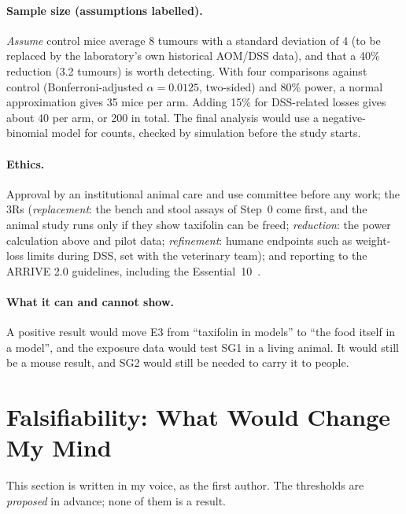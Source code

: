 \documentclass[11pt,a4paper]{article}
\begin{document}
\paragraph{Sample size (assumptions labelled).} \emph{Assume} control mice average 8 tumours with a standard deviation of 4 (to be replaced by the laboratory's own historical AOM/DSS data), and that a 40\% reduction (3.2 tumours) is worth detecting. With four comparisons against control (Bonferroni-adjusted $\alpha=0.0125$, two-sided) and 80\% power, a normal approximation gives 35 mice per arm. Adding 15\% for DSS-related losses gives about 40 per arm, or 200 in total. The final analysis would use a negative-binomial model for counts, checked by simulation before the study starts.

\paragraph{Ethics.} Approval by an institutional animal care and use committee before any work; the 3Rs (\emph{replacement}: the bench and stool assays of Step~0 come first, and the animal study runs only if they show taxifolin can be freed; \emph{reduction}: the power calculation above and pilot data; \emph{refinement}: humane endpoints such as weight-loss limits during DSS, set with the veterinary team); and reporting to the ARRIVE 2.0 guidelines, including the Essential~10~\cite{perciedusert2020}.

\paragraph{What it can and cannot show.} A positive result would move E3 from ``taxifolin in models'' to ``the food itself in a model'', and the exposure data would test SG1 in a living animal. It would still be a mouse result, and SG2 would still be needed to carry it to people.

\section{Falsifiability: What Would Change My Mind}
\label{sec:falsify}

\begin{voicebox}
This section is written in my voice, as the first author. The thresholds are \emph{proposed} in advance; none of them is a result.
\end{voicebox}
\end{document}
